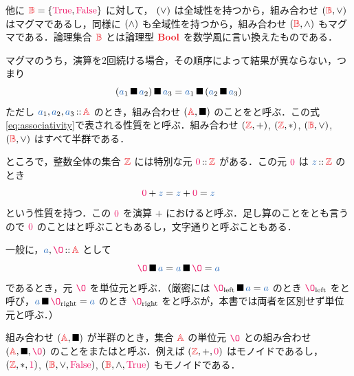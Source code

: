 \documentclass[a5paper,twoside,fleqn,draft]{jsbook}
\begin{document}
他に $\hSet{B}=\{\hTrue,\hFalse\}$ に対して， $(\operatorname{\vee})$ は全域性を持つから，組み合わせ $(\hSet{B},\hLogicalOr)$ はマグマであるし，同様に $(\operatorname{\wedge})$ も全域性を持つから，組み合わせ $(\hSet{B},\hLogicalAnd)$ もマグマである．論理集合 $\hSet{B}$ とは論理型 $\hBool$ を数学風に言い換えたものである．

マグマのうち，演算を2回続ける場合，その順序によって結果が異ならない，つまり
\begin{equation}
  \label{eq:associativity}
  \left(\hVar{a}_1\hAnyBinOp \hVar{a}_2\right)\hAnyBinOp \hVar{a}_3
  =\hVar{a}_1\hAnyBinOp\left(\hVar{a}_2\hAnyBinOp{\hVar{a}_3}\right)
\end{equation}
ただし $\hVar{a}_1,\hVar{a}_2,\hVar{a}_3\hIsTypeOf\hSet{A}$ のとき，組み合わせ $(\hSet{A},\hAnyBinOp)$ のことをと呼ぶ．この式\eqref{eq:associativity}で表される性質をと呼ぶ．組み合わせ $(\hSet{Z},+)$, $(\hSet{Z},*)$, $(\hSet{B},\hLogicalOr)$, $(\hSet{B},\hLogicalOr)$ はすべて半群である．

\separator

ところで，整数全体の集合 $\hSet{Z}$ には特別な元 $\hConstant{0}\hIsTypeOf\hSet{Z}$ がある．この元 $\hConstant{0}$ は $\hVar{z}\hIsTypeOf\hSet{Z}$ のとき
\begin{equation}
  \hConstant{0}+\hVar{z}
  =\hVar{z}+\hConstant{0}
  =\hVar{z}
\end{equation}
という性質を持つ．この $\hConstant{0}$ を演算 $+$ におけると呼ぶ．足し算のことをとも言うので $\hConstant{0}$ のことはと呼ぶこともあるし，文字通りと呼ぶこともある．

一般に，$\hVar{a},\hZero\hIsTypeOf\hSet{A}$ として
\begin{equation}
  \label{eq:identity}
  \hZero\hAnyBinOp\hVar{a}
  =\hVar{a}\hAnyBinOp\hZero
  =\hVar{a}
\end{equation}
であるとき，元 $\hZero$ を単位元と呼ぶ．（厳密には $\hZero_\text{left}\hAnyBinOp\hVar{a}=\hVar{a}$ のとき $\hZero_\text{left}$ をと呼び，$\hVar{a}\hAnyBinOp\hZero_\text{right}=\hVar{a}$ のとき $\hZero_\text{right}$ をと呼ぶが，本書では両者を区別せず単位元と呼ぶ．）

組み合わせ $(\hSet{A},\hAnyBinOp)$ が半群のとき，集合 $\hSet{A}$ の単位元 $\hZero$ との組み合わせ $(\hSet{A},\hAnyBinOp,\hZero)$ のことをまたはと呼ぶ．例えば $(\hSet{Z},+,\hConstant{0})$ はモノイドであるし，$(\hSet{Z},*,\hConstant{1})$, $(\hSet{B},\hLogicalOr,\hFalse)$, $(\hSet{B},\hLogicalAnd,\hTrue)$ もモノイドである．
\end{document}
